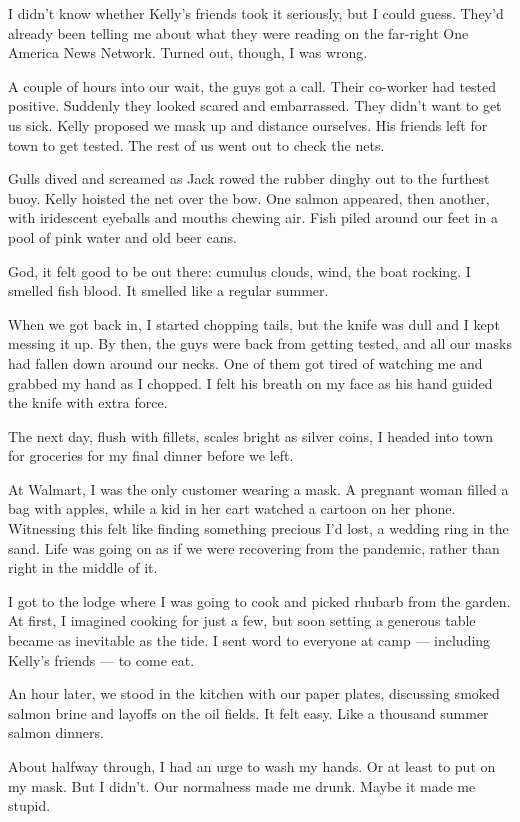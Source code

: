 I didn't know whether Kelly's friends took it seriously, but I could
guess. They'd already been telling me about what they were reading on
the far-right One America News Network. Turned out, though, I was wrong.

A couple of hours into our wait, the guys got a call. Their co-worker
had tested positive. Suddenly they looked scared and embarrassed. They
didn't want to get us sick. Kelly proposed we mask up and distance
ourselves. His friends left for town to get tested. The rest of us went
out to check the nets.

Gulls dived and screamed as Jack rowed the rubber dinghy out to the
furthest buoy. Kelly hoisted the net over the bow. One salmon appeared,
then another, with iridescent eyeballs and mouths chewing air. Fish
piled around our feet in a pool of pink water and old beer cans.

God, it felt good to be out there: cumulus clouds, wind, the boat
rocking. I smelled fish blood. It smelled like a regular summer.

When we got back in, I started chopping tails, but the knife was dull
and I kept messing it up. By then, the guys were back from getting
tested, and all our masks had fallen down around our necks. One of them
got tired of watching me and grabbed my hand as I chopped. I felt his
breath on my face as his hand guided the knife with extra force.

The next day, flush with fillets, scales bright as silver coins, I
headed into town for groceries for my final dinner before we left.

At Walmart, I was the only customer wearing a mask. A pregnant woman
filled a bag with apples, while a kid in her cart watched a cartoon on
her phone. Witnessing this felt like finding something precious I'd
lost, a wedding ring in the sand. Life was going on as if we were
recovering from the pandemic, rather than right in the middle of it.

I got to the lodge where I was going to cook and picked rhubarb from the
garden. At first, I imagined cooking for just a few, but soon setting a
generous table became as inevitable as the tide. I sent word to everyone
at camp --- including Kelly's friends --- to come eat.

An hour later, we stood in the kitchen with our paper plates, discussing
smoked salmon brine and layoffs on the oil fields. It felt easy. Like a
thousand summer salmon dinners.

About halfway through, I had an urge to wash my hands. Or at least to
put on my mask. But I didn't. Our normalness made me drunk. Maybe it
made me stupid.

